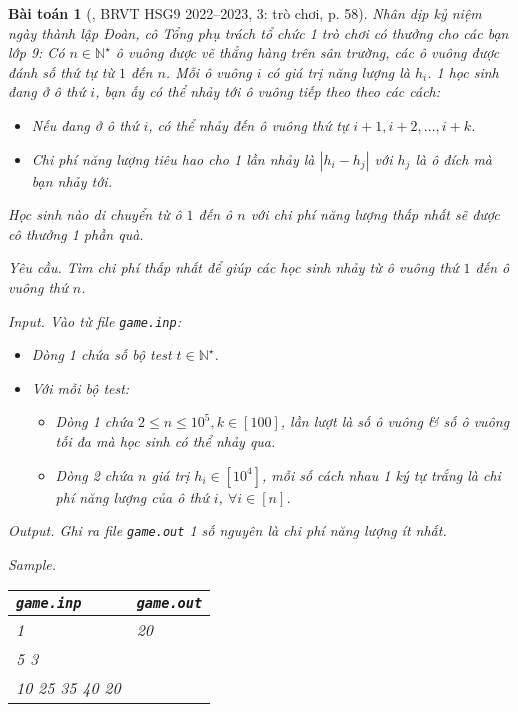 \documentclass{article}
\newtheorem{baitoan}{Bài toán}
\begin{document}
\begin{baitoan}[\cite{Trung_THCS_Tin}, BRVT HSG9 2022--2023, 3: trò chơi, p. 58]
	Nhân dịp kỷ niệm ngày thành lập Đoàn, cô Tổng phụ trách tổ chức 1 trò chơi có thưởng cho các bạn lớp 9: Có $n\in\mathbb{N}^\star$ ô vuông được vẽ thẳng hàng trên sân trường, các ô vuông được đánh số thứ tự từ $1$ đến $n$. Mỗi ô vuông $i$ có giá trị năng lượng là $h_i$. 1 học sinh đang ở ô thứ $i$, bạn ấy có thể nhảy tới ô vuông tiếp theo theo các cách:
	\begin{itemize}
		\item Nếu đang ở ô thứ $i$, có thể nhảy đến ô vuông thứ tự $i + 1,i + 2,\ldots,i + k$.
		\item Chi phí năng lượng tiêu hao cho 1 lần nhảy là $|h_i - h_j|$ với $h_j$ là ô đích mà bạn nhảy tới.
	\end{itemize}
	Học sinh nào di chuyển từ ô $1$ đến ô $n$ với chi phí năng lượng thấp nhất sẽ được cô thưởng 1 phần quà.
	\item {\sf Yêu cầu.} Tìm chi phí thấp nhất để giúp các học sinh nhảy từ ô vuông thứ $1$ đến ô vuông thứ $n$.
	\item {\sf Input.} Vào từ file {\tt game.inp}:
	\begin{itemize}
		\item Dòng 1 chứa số bộ test $t\in\mathbb{N}^\star$.
		\item Với mỗi bộ test:
		\begin{itemize}
			\item Dòng 1 chứa $2\le n\le10^5,k\in[100]$, lần lượt là số ô vuông \& số ô vuông tối đa mà học sinh có thể nhảy qua.
			\item Dòng 2 chứa $n$ giá trị $h_i\in[10^4]$, mỗi số cách nhau 1 ký tự trắng là chi phí năng lượng của ô thứ $i$, $\forall i\in[n]$.
		\end{itemize}
	\end{itemize}
	\item {\sf Output.} Ghi ra file {\tt game.out} 1 số nguyên là chi phí năng lượng ít nhất.
	\item {\sf Sample.}
	\begin{table}[H]
		\centering
		\begin{tabular}{|l|l|}
			\hline
			{\tt game.inp} & {\tt game.out} \\
			\hline
			1 & 20 \\
			5 3 &  \\
			10 25 35 40 20 & \\
			\hline
		\end{tabular}
	\end{table}
\end{baitoan}
\end{document}
